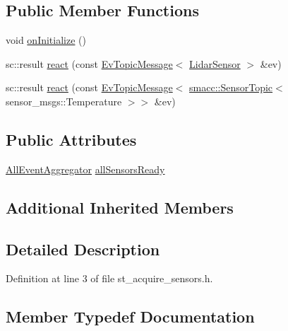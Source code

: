 \subsection*{Public Member Functions}
\begin{DoxyCompactItemize}
\item 
void \hyperlink{structStAcquireSensors_af25bdea33dab12d2c37301eb999ac6e8}{on\+Initialize} ()
\item 
sc\+::result \hyperlink{structStAcquireSensors_aa3c461ccdb69aa4c7d09b88dae21c646}{react} (const \hyperlink{structsmacc_1_1EvTopicMessage}{Ev\+Topic\+Message}$<$ \hyperlink{sensor__state_8h_a9db9e1944f88de79507758d08e4a2ee3}{Lidar\+Sensor} $>$ \&ev)
\item 
sc\+::result \hyperlink{structStAcquireSensors_af69db5f01143f5b9267fbd39fc566be8}{react} (const \hyperlink{structsmacc_1_1EvTopicMessage}{Ev\+Topic\+Message}$<$ \hyperlink{classsmacc_1_1SensorTopic}{smacc\+::\+Sensor\+Topic}$<$ sensor\+\_\+msgs\+::\+Temperature $>$$>$ \&ev)
\end{DoxyCompactItemize}
\subsection*{Public Attributes}
\begin{DoxyCompactItemize}
\item 
\hyperlink{classAllEventAggregator}{All\+Event\+Aggregator} \hyperlink{structStAcquireSensors_adc57ee1bdc2d1622b65811366f70845b}{all\+Sensors\+Ready}
\end{DoxyCompactItemize}
\subsection*{Additional Inherited Members}


\subsection{Detailed Description}


Definition at line 3 of file st\+\_\+acquire\+\_\+sensors.\+h.



\subsection{Member Typedef Documentation}
